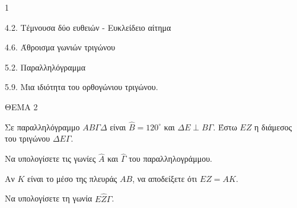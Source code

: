 \begin{ylh}{1}
    \item 4.2. Τέμνουσα δύο ευθειών - Ευκλείδειο αίτημα
    \item 4.6. Άθροισμα γωνιών τριγώνου
    \item 5.2. Παραλληλόγραμμα
    \item 5.9. Μια ιδιότητα του ορθογώνιου τριγώνου.
\end{ylh}

ΘΕΜΑ 2

Σε παραλληλόγραμμο $ΑΒ\Gamma\Delta$ είναι $\widehat{Β} = 120^{\circ}$ και $\Delta Ε \perp B\Gamma$. Έστω $EZ$ η διάμεσος του τριγώνου $\Delta E\Gamma$.

\begin{alist}
\item Να υπολογίσετε τις γωνίες $\widehat{Α}$ και $\widehat{\Gamma}$ του παραλληλογράμμου. 
\item Αν $K$ είναι το μέσο της πλευράς $AB$, να αποδείξετε ότι $EZ = AK$. 
\item Να υπολογίσετε τη γωνία $E\widehat{Z}\Gamma$. 

\begin{center}
\end{center}
\end{alist}
